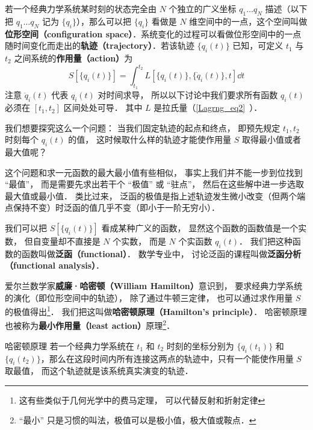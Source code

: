 

若一个经典力学系统某时刻的状态完全由 $N$ 个独立的广义坐标 $q_1\dots q_N$ 描述（以下把 $q_1\dots q_N$ 记为 $\{q_i\}$），那么可以把 $\{q_i\}$ 看做是 $N$ 维空间中的一点，这个空间叫做\textbf{位形空间（configuration space）}．系统变化的过程可以看做位形空间中的一点随时间变化而走出的\textbf{轨迹（trajectory）}．若该轨迹 $\{ {{q_i}(t)} \}$ 已知，可定义 $t_1$ 与 $t_2$ 之间系统的\textbf{作用量（action）}为
\begin{equation}\label{HamPrn_eq1}
S[\{q_i(t)\}] = \int_{t_1}^{t_2} L[\{q_i(t)\}, \{\dot q_i(t)\}, t] \dd{t}
\end{equation}
注意 $\dot q_i(t)$ 代表 $q_i(t)$ 对时间求导， 所以以下讨论中我们要求所有函数 $q_i(t)$ 必须在 $[t_1, t_2]$ 区间处处可导． 其中 $L$ 是拉氏量（\autoref{Lagrng_eq2}~）．

我们想要探究这么一个问题： 当我们固定轨迹的起点和终点， 即预先规定 $t_1, t_2$ 时刻每个 $q_i(t)$ 的值， 这时候取什么样的轨迹才能使作用量 $S$ 取得最小值或者最大值呢？

这个问题和求一元函数的最大最小值有些相似， 事实上我们并不能一步到位找到 “最值”， 而是需要先求出若干个 “极值” 或 “驻点”， 然后在这些解中进一步选取最大值或最小值． 类比过来， 泛函的极值是指上述轨迹发生微小改变（但两个端点保持不变）时泛函的值几乎不变（即小于一阶无穷小）．

我们可以把 $S[\{q_i(t)\}]$ 看成某种广义的函数， 显然这个函数的函数值是一个实数， 但自变量却不直接是 $N$ 个实数， 而是 $N$ 个实函数 $q_i(t)$． 我们把这种函数的函数叫做\textbf{泛函（functional）}．%
数学专业中， 讨论泛函的课程叫做\textbf{泛函分析（functional analysis）}．

爱尔兰数学家\textbf{威廉·哈密顿（William Hamilton）}意识到， 要求经典力学系统的演化（即位形空间中的轨迹）， 除了通过牛顿三定律， 也可以通过求作用量 $S$ 的极值得出\footnote{这有些类似于几何光学中的费马定理， 可以代替反射和折射定律}． 我们把这叫做\textbf{哈密顿原理（Hamilton's principle）}． 哈密顿原理也被称为\textbf{最小作用量（least action）}原理\footnote{“最小” 只是习惯的叫法，极值可以是极小值，极大值或鞍点．}．%

\begin{theorem}{哈密顿原理}
若一个经典力学系统在 $t_1$ 和 $t_2$ 时刻的坐标分别为 $\{q_i(t_1)\}$ 和 $\{q_i(t_2)\}$，那么在这段时间内所有连接这两点的轨迹中，只有一个能使作用量 $S$ 取最值， 而这个轨迹就是该系统真实演变的轨迹．
\end{theorem}

